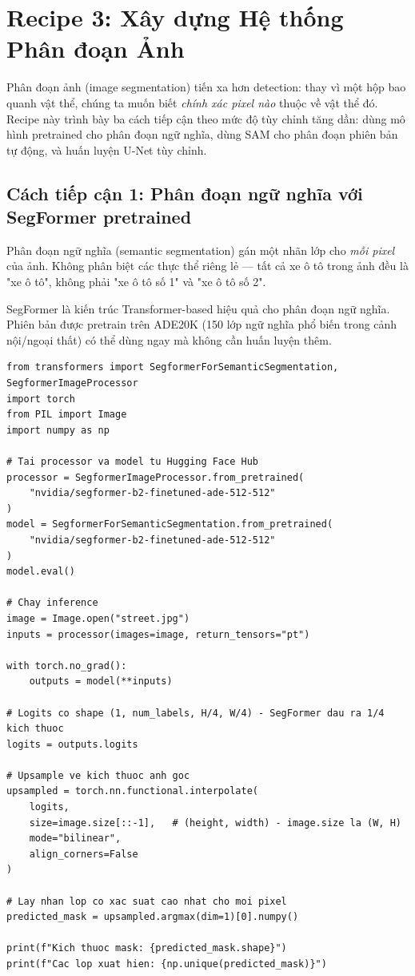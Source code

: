 \section{Recipe 3: Xây dựng Hệ thống Phân đoạn Ảnh}
\label{sec:recipe_segmentation}

Phân đoạn ảnh (image segmentation) tiến xa hơn detection: thay vì một hộp bao quanh vật thể, chúng ta muốn biết \textit{chính xác pixel nào} thuộc về vật thể đó. Recipe này trình bày ba cách tiếp cận theo mức độ tùy chỉnh tăng dần: dùng mô hình pretrained cho phân đoạn ngữ nghĩa, dùng SAM cho phân đoạn phiên bản tự động, và huấn luyện U-Net tùy chỉnh.

\subsection{Cách tiếp cận 1: Phân đoạn ngữ nghĩa với SegFormer pretrained}
\label{subsec:seg_segformer}

Phân đoạn ngữ nghĩa (semantic segmentation) gán một nhãn lớp cho \textit{mỗi pixel} của ảnh. Không phân biệt các thực thể riêng lẻ --- tất cả xe ô tô trong ảnh đều là "xe ô tô", không phải "xe ô tô số 1" và "xe ô tô số 2".

SegFormer là kiến trúc Transformer-based hiệu quả cho phân đoạn ngữ nghĩa. Phiên bản được pretrain trên ADE20K (150 lớp ngữ nghĩa phổ biến trong cảnh nội/ngoại thất) có thể dùng ngay mà không cần huấn luyện thêm.

\begin{verbatim}
from transformers import SegformerForSemanticSegmentation, SegformerImageProcessor
import torch
from PIL import Image
import numpy as np

# Tai processor va model tu Hugging Face Hub
processor = SegformerImageProcessor.from_pretrained(
    "nvidia/segformer-b2-finetuned-ade-512-512"
)
model = SegformerForSemanticSegmentation.from_pretrained(
    "nvidia/segformer-b2-finetuned-ade-512-512"
)
model.eval()

# Chay inference
image = Image.open("street.jpg")
inputs = processor(images=image, return_tensors="pt")

with torch.no_grad():
    outputs = model(**inputs)

# Logits co shape (1, num_labels, H/4, W/4) - SegFormer dau ra 1/4 kich thuoc
logits = outputs.logits

# Upsample ve kich thuoc anh goc
upsampled = torch.nn.functional.interpolate(
    logits,
    size=image.size[::-1],   # (height, width) - image.size la (W, H)
    mode="bilinear",
    align_corners=False
)

# Lay nhan lop co xac suat cao nhat cho moi pixel
predicted_mask = upsampled.argmax(dim=1)[0].numpy()

print(f"Kich thuoc mask: {predicted_mask.shape}")
print(f"Cac lop xuat hien: {np.unique(predicted_mask)}")
\end{verbatim}

